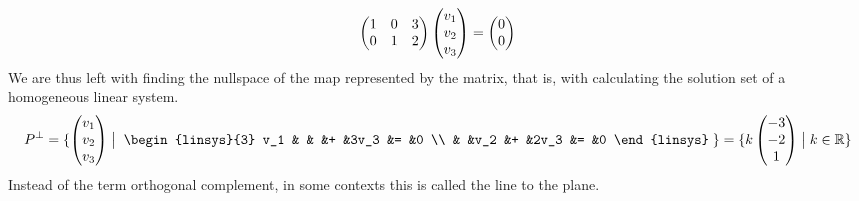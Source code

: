 \begin{example}
\begin{equation*}
{\begin{pmatrix}
                                                      1  &0  &3  \\
                                                      0  &1  &2
                                                    \end{pmatrix}
                                                    \begin{pmatrix} v_1 \\ v_2 \\ v_3 \end{pmatrix}
                                                    =\begin{pmatrix} 0 \\ 0 \end{pmatrix} }
\end{equation*}
We are thus left with finding the nullspace of the map represented 
by the matrix, that is, with 
calculating the solution set of a homogeneous linear system.
\begin{equation*}
  P^\perp
  =\set{\colvec{v_1 \\ v_2 \\ v_3}\suchthat \;\begin{linsys}{3}
                                              v_1 &  &    &+ &3v_3 &= &0 \\
                                                  &  &v_2 &+ &2v_3 &= &0
                                            \end{linsys}\; }
  =\set{k\colvec{-3 \\ -2 \\ 1}\suchthat k\in\Re}
\end{equation*}
Instead of the term orthogonal complement,
in some contexts this is called the line  %
to the plane.
\end{example}

